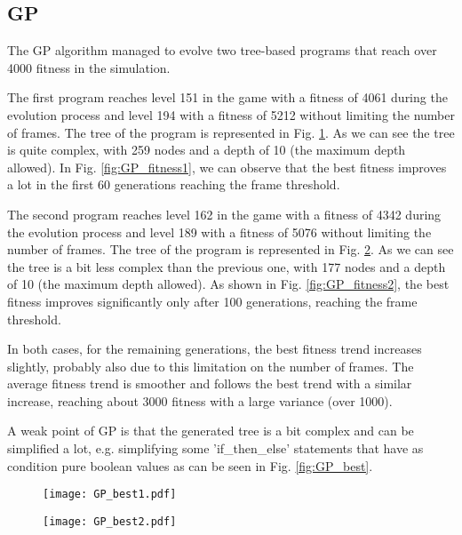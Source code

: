 \subsection{GP}
The GP algorithm managed to evolve two tree-based programs that reach over 4000 fitness in the simulation.

The first program reaches level 151 in the
game with a fitness of 4061 during the evolution process and level 194 with a fitness of 5212
without limiting the number of frames. The tree of the program is represented in Fig. \ref{fig:GP_best1}. As
we can see the tree is quite complex, with 259 nodes and a depth of 10 (the maximum depth
allowed). In Fig. \ref{fig:GP_fitness1}, we can observe that the best fitness improves a lot in the first 60
generations reaching the frame threshold.

The second program reaches level 162 in the game with a fitness of 4342 during the evolution process and 
level 189 with a fitness of 5076 without limiting the number of frames. The tree of the program is 
represented in Fig. \ref{fig:GP_best2}. As we can see the tree is a bit less complex than the previous one, with 177 nodes 
and a depth of 10 (the maximum depth allowed). As shown in Fig. \ref{fig:GP_fitness2}, the best fitness improves significantly 
only after 100 generations, reaching the frame threshold.

In both cases, for the remaining generations, the best fitness trend increases slightly, probably also due 
to this limitation on the number of frames. The average fitness trend is smoother and follows the best trend 
with a similar increase, reaching about 3000 fitness with a large variance (over 1000).

A weak point of GP is that the generated tree is a bit complex and can be simplified a lot,
e.g. simplifying some 'if\_then\_else' statements that have as condition pure boolean values as can be
seen in Fig. \ref{fig:GP_best}.

\begin{figure*}[t!]
    \centering
    \begin{subfigure}[b]{0.45\textwidth}
        \centering
        \texttt{[image: GP\_best1.pdf]}
        \caption{}
        \label{fig:GP_best1}
    \end{subfigure}
    \hspace{1mm}
    \begin{subfigure}[b]{0.45\textwidth}
        \centering
        \texttt{[image: GP\_best2.pdf]}
        \caption{}
        \label{fig:GP_best2}
    \end{subfigure}
       \caption{Best tree-based programs generated by GP.}
       \label{fig:GP_best}
\end{figure*}


